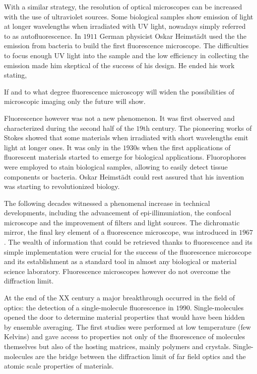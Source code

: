 With a similar strategy, the resolution of optical microscopes can be increased
with the use of ultraviolet sources. Some biological samples show emission of
light at longer wavelengths when irradiated with UV light, nowadays simply
referred to as autofluorescence. In $1911$ German physicist Oskar Heimst\"{a}dt
used the the emission from bacteria to build the first fluorescence
microscope\cite{Heimstadt1911}. The difficulties to focus enough UV light into
the sample and the low efficiency in collecting the emission made him skeptical
of the success of his design. He ended his work stating\cite{Rusk2009},

\begin{displayquote}
If and to what degree fluorescence microscopy will widen the possibilities of
microscopic imaging only the future will show.
\end{displayquote}

Fluorescence however was not a new phenomenon. It was first observed and
characterized during the second half of the $19$th century. The pioneering works
of Stokes showed that some materials when irradiated with short wavelengths emit
light at longer ones. It was only in the $1930$s when the first applications of
fluorescent materials started to emerge for biological applications.
Fluorophores were employed to stain biological samples, allowing to easily
detect tissue components or bacteria. Oskar Heimst\"{a}dt could rest assured
that his invention was starting to revolutionized biology. 

The following decades witnessed a phenomenal increase in technical developments,
including the advancement of epi-illimuniation, the confocal microscope and the
improvement of filters and light sources. The dichromatic mirror, the final key
element of a fluorescence microscope, was introduced in $1967$\cite{Ploem1967}.
The wealth of information that could be retrieved thanks to fluorescence and its
simple implementation were crucial for the success of the fluorescence
microscope and its establishment as a standard tool in almost any biological or
material science laboratory. Fluorescence microscopes however do not overcome
the diffraction limit. 

At the end of the XX century a major breakthrough occurred in the field of
optics: the detection of a single-molecule fluorescence in
$1990$\cite{PhysRevLett.65.2716}. Single-molecules opened the door to determine
material properties that would have been hidden by ensemble averaging.
The first studies were performed at low temperature (few Kelvins) and gave
access to properties not only of the fluorescence of molecules themselves but
also of the hosting matrices, mainly polymers and crystals. Single-molecules are the bridge
between the diffraction limit of far field optics and the atomic scale
properties of materials. 

